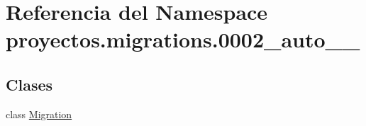 \hypertarget{namespaceproyectos_1_1migrations_1_10002__auto__20160610__1357}{}\section{Referencia del Namespace proyectos.\+migrations.0002\+\_\+auto\+\_\+\_}
\label{namespaceproyectos_1_1migrations_1_10002__auto__20160610__1357}
\subsection*{Clases}
\begin{DoxyCompactItemize}
\item 
class \hyperlink{classproyectos_1_1migrations_1_10002__auto__20160610__1357_1_1_migration}{Migration}
\end{DoxyCompactItemize}
